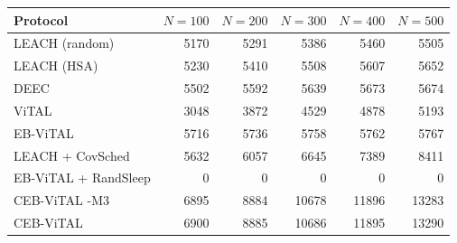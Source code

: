 \begin{tabular}{lrrrrr}
\hline
Protocol & $N=100$ & $N=200$ & $N=300$ & $N=400$ & $N=500$ \\
\hline
LEACH (random) & 5170 & 5291 & 5386 & 5460 & 5505 \\
LEACH (HSA) & 5230 & 5410 & 5508 & 5607 & 5652 \\
DEEC & 5502 & 5592 & 5639 & 5673 & 5674 \\
ViTAL & 3048 & 3872 & 4529 & 4878 & 5193 \\
EB-ViTAL & 5716 & 5736 & 5758 & 5762 & 5767 \\
LEACH + CovSched & 5632 & 6057 & 6645 & 7389 & 8411 \\
EB-ViTAL + RandSleep & 0 & 0 & 0 & 0 & 0 \\
CEB-ViTAL -M3 & 6895 & 8884 & 10678 & 11896 & 13283 \\
CEB-ViTAL & 6900 & 8885 & 10686 & 11895 & 13290 \\
\hline
\end{tabular}
